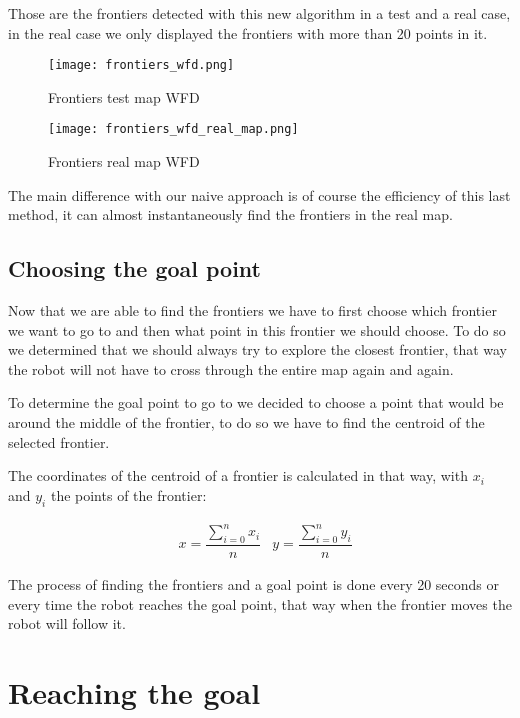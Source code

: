 Those are the frontiers detected with this new algorithm in a test and a real case, in the real case we only displayed the frontiers with more than 20 points in it.

\FloatBarrier
\begin{figure}
    \centering\texttt{[image: frontiers\_wfd.png]}
    \label{fig:frontiers_wfd}
    \caption{Frontiers test map WFD}
\end{figure}
\FloatBarrier
\begin{figure}
    \centering\texttt{[image: frontiers\_wfd\_real\_map.png]}
    \label{fig:frontiers_wfd_real_map}
    \caption{Frontiers real map WFD}
\end{figure}
\FloatBarrier

The main difference with our naive approach is of course the efficiency of this last method, it can almost instantaneously find the frontiers in the real map.

\subsection{Choosing the goal point}

Now that we are able to find the frontiers we have to first choose which frontier we want to go to and then what point in this frontier we should choose.
To do so we determined that we should always try to explore the closest frontier, that way the robot will not have to cross through the entire map again and again.

To determine the goal point to go to we decided to choose a point that would be around the middle of the frontier, to do so we have to find the centroid of the selected frontier.

The coordinates of the centroid of a frontier is calculated in that way, with $x_i$ and $y_i$ the points of the frontier:

\begin{align*}
    &x = \dfrac{\sum_{i=0}^{n}x_i}{n}   &y = \dfrac{\sum_{i=0}^{n}y_i}{n}
\end{align*}

The process of finding the frontiers and a goal point is done every 20 seconds or every time the robot reaches the goal point, that way when the frontier moves the robot will follow it.

\section{Reaching the goal}

